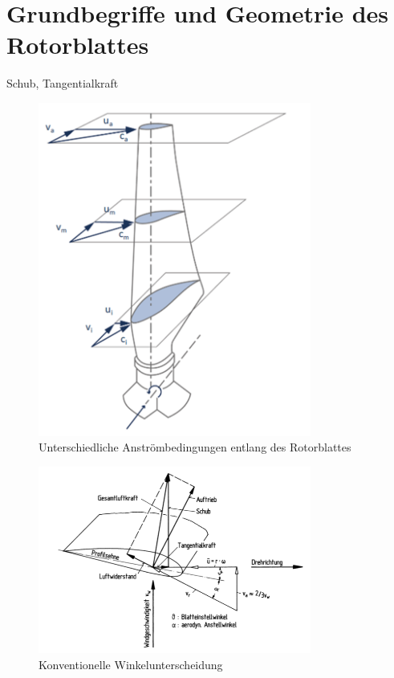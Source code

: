 \section{Grundbegriffe und Geometrie des Rotorblattes}

Schub, Tangentialkraft

\begin{figure}[htbp] %
    \centering %
    \includegraphics[width=0.8\textwidth]{figures/verwindung.png} %
    \caption{Unterschiedliche Anströmbedingungen entlang des Rotorblattes \cite{noauthor_aerodynamik_nodate}} %
    \label{fig:verwindung} %
\end{figure}

\begin{figure}[htbp] %
    \centering %
    \includegraphics[width=0.8\textwidth]{figures/kraft_an_blatt.png} %
    \caption{Konventionelle Winkelunterscheidung \cite{hau_physikalische_2016}} %
    \label{fig:kraft_an_blatt} %
\end{figure}


